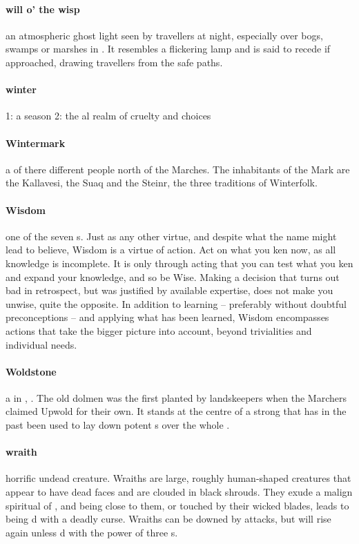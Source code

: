 \paragraph{will o' the wisp} an atmospheric ghost light seen by travellers at night, especially over bogs, swamps or marshes in . It resembles a flickering lamp and is said to recede if approached, drawing travellers from the safe paths.
\paragraph{winter} 1: a season 2: the al realm of cruelty and choices
\paragraph{Wintermark} a  of there different people north of the Marches. The inhabitants of the Mark are the Kallavesi, the Suaq and the Steinr, the three traditions of Winterfolk.
\paragraph{Wisdom} one of the seven s. Just as any other virtue, and despite what the name might lead to believe, Wisdom is a virtue of action. Act on what you ken now, as all knowledge is incomplete. It is only through acting that you can test what you ken and expand your knowledge, and so be Wise. Making a decision that turns out bad in retrospect, but was justified by available expertise, does not make you unwise, quite the opposite. In addition to learning – preferably without doubtful preconceptions – and applying what has been learned, Wisdom encompasses actions that take the bigger picture into account, beyond trivialities and individual needs. 
\paragraph{Woldstone} a  in , . The old dolmen was the first  planted by landskeepers when the Marchers claimed Upwold for their own. It stands at the centre of a strong   that has in the past been used to lay down potent s over the whole . 
\paragraph{wraith} horrific undead creature. Wraiths are large, roughly human-shaped creatures that appear to have dead faces and are clouded in black shrouds. They exude a malign spiritual  of , and being close to them, or touched by their wicked blades, leads to being d with a deadly curse. Wraiths can be downed by attacks, but will rise again unless d with the power of three s.
